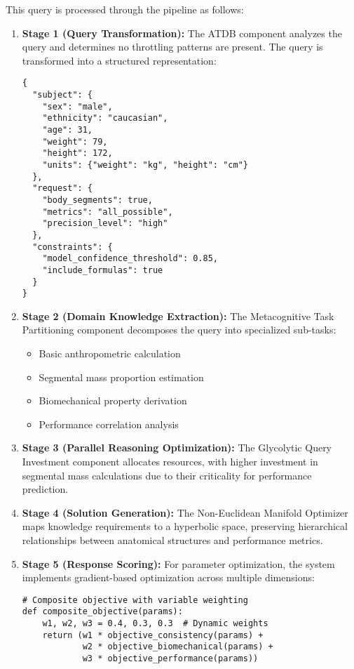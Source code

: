 \documentclass[journal,onecolumn]{IEEEtran}
\begin{document}
This query is processed through the pipeline as follows:

\begin{enumerate}
\item \textbf{Stage 1 (Query Transformation):} The ATDB component analyzes the query and determines no throttling patterns are present. The query is transformed into a structured representation:
\begin{lstlisting}[caption={Structured Query Representation}, label={lst:structured-query}]
{
  "subject": {
    "sex": "male",
    "ethnicity": "caucasian",
    "age": 31,
    "weight": 79,
    "height": 172,
    "units": {"weight": "kg", "height": "cm"}
  },
  "request": {
    "body_segments": true,
    "metrics": "all_possible",
    "precision_level": "high"
  },
  "constraints": {
    "model_confidence_threshold": 0.85,
    "include_formulas": true
  }
}
\end{lstlisting}

\item \textbf{Stage 2 (Domain Knowledge Extraction):} The Metacognitive Task Partitioning component decomposes the query into specialized sub-tasks:
\begin{itemize}
    \item Basic anthropometric calculation
    \item Segmental mass proportion estimation
    \item Biomechanical property derivation
    \item Performance correlation analysis
\end{itemize}

\item \textbf{Stage 3 (Parallel Reasoning Optimization):} The Glycolytic Query Investment component allocates resources, with higher investment in segmental mass calculations due to their criticality for performance prediction.

\item \textbf{Stage 4 (Solution Generation):} The Non-Euclidean Manifold Optimizer maps knowledge requirements to a hyperbolic space, preserving hierarchical relationships between anatomical structures and performance metrics.

\item \textbf{Stage 5 (Response Scoring):} For parameter optimization, the system implements gradient-based optimization across multiple dimensions:
\begin{lstlisting}[caption={Parameter Optimization Process}, label={lst:optimization}]
# Composite objective with variable weighting
def composite_objective(params):
    w1, w2, w3 = 0.4, 0.3, 0.3  # Dynamic weights
    return (w1 * objective_consistency(params) + 
            w2 * objective_biomechanical(params) + 
            w3 * objective_performance(params))


\end{lstlisting}
\end{enumerate}
\end{document}
